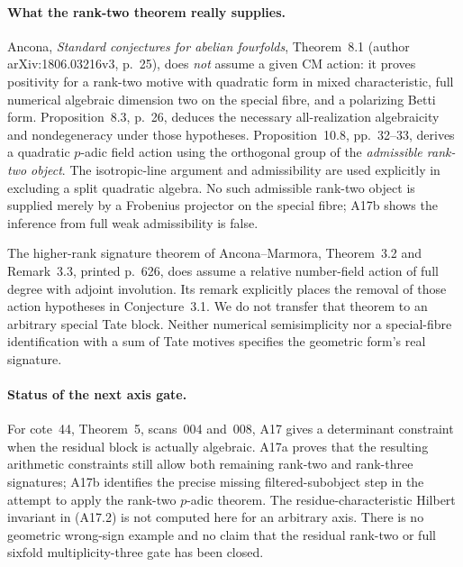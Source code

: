 \documentclass[11pt]{article}
\theoremstyle{remark}\newtheorem{remark}[theorem]{Remark}
\begin{document}
\paragraph{What the rank-two theorem really supplies.}
Ancona, \emph{Standard conjectures for abelian fourfolds},
Theorem~8.1 (author arXiv:1806.03216v3, p.~25), does
\emph{not} assume a given CM action: it proves positivity
for a rank-two motive with quadratic form in mixed
characteristic, full numerical algebraic dimension two
on the special fibre, and a polarizing Betti form.
Proposition~8.3, p.~26, deduces the necessary all-realization
algebraicity and nondegeneracy under those hypotheses.
Proposition~10.8, pp.~32--33, derives a quadratic
$p$-adic field action using the orthogonal group of the
\emph{admissible rank-two object}. The isotropic-line
argument and admissibility are used explicitly in
excluding a split quadratic algebra. No such admissible
rank-two object is supplied merely by a Frobenius
projector on the special fibre; A17b shows the inference
from full weak admissibility is false.

The higher-rank signature theorem of Ancona--Marmora,
Theorem~3.2 and Remark~3.3, printed p.~626, does assume
a relative number-field action of full degree with
adjoint involution. Its remark explicitly places the
removal of those action hypotheses in Conjecture~3.1.
We do not transfer that theorem to an arbitrary
special Tate block. Neither numerical semisimplicity
nor a special-fibre identification with a sum of Tate
motives specifies the geometric form's real signature.

\paragraph{Status of the next axis gate.}
For cote~44, Theorem~5, scans~004 and~008, A17 gives a
determinant constraint when the residual block is
actually algebraic. A17a proves that the resulting
arithmetic constraints still allow both remaining
rank-two and rank-three signatures; A17b identifies
the precise missing filtered-subobject step in the
attempt to apply the rank-two $p$-adic theorem.
The residue-characteristic Hilbert invariant in
(A17.2) is not computed here for an arbitrary axis.
There is no geometric wrong-sign example and no claim
that the residual rank-two or full sixfold
multiplicity-three gate has been closed.
\end{document}
